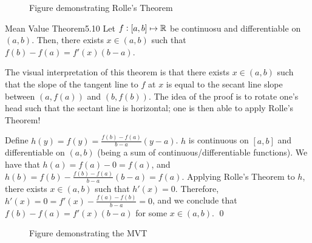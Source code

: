 \begin{figure}[htbp]
    \centering
    
    \caption{Figure demonstrating Rolle's Theorem}
    \label{fig21}
\end{figure}

\setcounter{rudin}{9}
\begin{theorem}{Mean Value Theorem}{5.10}
    Let $f: [a, b] \mapsto \mathbb{R}$ be continuosu and differentiable on $(a, b)$. Then, there exists $x \in (a, b)$ such that $f(b) - f(a) = f'(x)(b - a)$.
\end{theorem}
\noindent The visual interpretation of this theorem is that there exists $x \in (a, b)$ such that the slope of the tangent line to $f$ at $x$ is equal to the secant line slope between $(a, f(a))$ and $(b, f(b))$. The idea of the proof is to rotate one's head such that the sectant line is horizontal; one is then able to apply Rolle's Theorem!

\begin{nproof}
    Define $h(y) = f(y) = \frac{f(b) - f(a)}{b - a}(y - a)$. $h$ is continuous on $[a, b]$ and differentiable on $(a, b)$ (being a sum of continuous/differentiable functions). We have that $h(a) = f(a) - 0 = f(a)$, and $h(b) = f(b) - \frac{f(b) - f(a)}{b - a}(b - a) = f(a)$. Applying Rolle's Theorem to $h$, there exists $x \in (a, b)$ such that $h'(x) = 0$. Therefore, $h'(x) = 0 = f'(x) - \frac{f(a) - f(b)}{b - a} = 0$, and we conclude that $f(b) - f(a) = f'(x)(b - a)$ for some $x \in (a, b)$. \qed
\end{nproof}

\begin{figure}[htbp]
    \centering
    
    \caption{Figure demonstrating the MVT}
    \label{fig22}
\end{figure}


